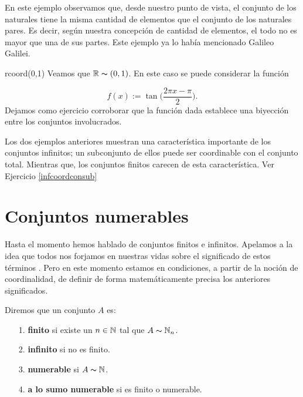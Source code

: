 En este ejemplo observamos que, desde nuestro punto de vista, el
conjunto de los naturales tiene la misma cantidad de elementos
que el conjunto de los naturales pares. Es decir, según nuestra concepción de cantidad de elementos, el
todo no es mayor que una de sus partes. Este ejemplo ya lo había mencionado Galileo Galilei.

\begin{ejemplo}{rcoord(0,1)} Veamos que $\mathbb{R}\thicksim (0,1)$. En este caso se
puede considerar la función

\[f(x):= \tan\biggl(\frac{2\pi x-\pi}{2}\biggr).\]
Dejamos como ejercicio corroborar que la función dada establece
una biyección entre los conjuntos involucrados.
\end{ejemplo}

Los dos ejemplos anteriores muestran una característica
importante de los conjuntos infinitos; un subconjunto de ellos
puede ser coordinable con el conjunto total. Mientras que, los
conjuntos finitos  carecen de esta característica.
Ver Ejercicio \vref{infcoordconsub}





\section{Conjuntos numerables}
Hasta el momento hemos hablado de conjuntos
finitos e infinitos. Apelamos a la idea que todos nos forjamos en nuestras vidas  sobre el significado de estos términos .  Pero en este momento estamos  en condiciones, a
partir de la noción  de coordinalidad, de definir de forma
matemáticamente precisa los anteriores  significados.
\begin{definicion}{}  Diremos que un conjunto $A$ es:
\begin{itemize}
\item[1.] \textbf{finito} si existe un $n\in\mathbb{N}$ tal que
$A\thicksim\mathbb{N}_n$.
\item[2.] \textbf{infinito }si no es finito.
\item[3.] \textbf{numerable} si $A\thicksim\mathbb{N}$.
\item[4.] \textbf{a lo sumo numerable} si es finito o numerable.
\end{itemize}
\end{definicion}

